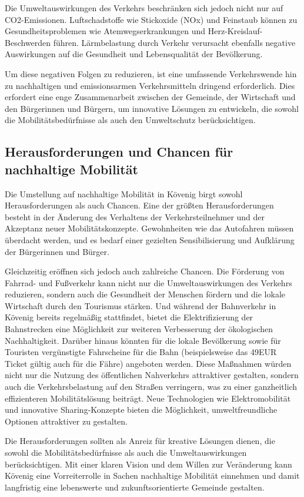   Die Umweltauswirkungen des Verkehrs beschränken sich jedoch nicht nur auf CO2-Emissionen. Luftschadstoffe wie Stickoxide (NOx) und Feinstaub können zu Gesundheitsproblemen wie Atemwegserkrankungen und Herz-Kreislauf-Beschwerden führen. Lärmbelastung durch Verkehr verursacht ebenfalls negative Auswirkungen auf die Gesundheit und Lebensqualität der Bevölkerung.

  Um diese negativen Folgen zu reduzieren, ist eine umfassende Verkehrswende hin zu nachhaltigen und emissionsarmen Verkehrsmitteln dringend erforderlich. Dies erfordert eine enge Zusammenarbeit zwischen der Gemeinde, der Wirtschaft und den Bürgerinnen und Bürgern, um innovative Lösungen zu entwickeln, die sowohl die Mobilitätsbedürfnisse als auch den Umweltschutz berücksichtigen.

\subsection{Herausforderungen und Chancen für nachhaltige Mobilität}
  Die Umstellung auf nachhaltige Mobilität in Kövenig birgt sowohl Herausforderungen als auch Chancen. Eine der größten Herausforderungen besteht in der Änderung des Verhaltens der Verkehrsteilnehmer und der Akzeptanz neuer Mobilitätskonzepte. Gewohnheiten wie das Autofahren müssen überdacht werden, und es bedarf einer gezielten Sensibilisierung und Aufklärung der Bürgerinnen und Bürger.

  Gleichzeitig eröffnen sich jedoch auch zahlreiche Chancen. Die Förderung von Fahrrad- und Fußverkehr kann nicht nur die Umweltauswirkungen des Verkehrs reduzieren, sondern auch die Gesundheit der Menschen fördern und die lokale Wirtschaft durch den Tourismus stärken. Und während der Bahnverkehr in Kövenig bereits regelmäßig stattfindet, bietet die Elektrifizierung der Bahnstrecken eine Möglichkeit zur weiteren Verbesserung der ökologischen Nachhaltigkeit. Darüber hinaus könnten für die lokale Bevölkerung sowie für Touristen vergünstigte Fahrscheine für die Bahn (beispielsweise das 49EUR Ticket gültig auch für die Fähre) angeboten werden. Diese Maßnahmen würden nicht nur die Nutzung des öffentlichen Nahverkehrs attraktiver gestalten, sondern auch die Verkehrsbelastung auf den Straßen verringern, was zu einer ganzheitlich effizienteren Mobilitätslösung beiträgt. Neue Technologien wie Elektromobilität und innovative Sharing-Konzepte bieten die Möglichkeit, umweltfreundliche Optionen attraktiver zu gestalten.

Die Herausforderungen sollten als Anreiz für kreative Lösungen dienen, die sowohl die Mobilitätsbedürfnisse als auch die Umweltauswirkungen berücksichtigen. Mit einer klaren Vision und dem Willen zur Veränderung kann Kövenig eine Vorreiterrolle in Sachen nachhaltige Mobilität einnehmen und damit langfristig eine lebenswerte und zukunftsorientierte Gemeinde gestalten.